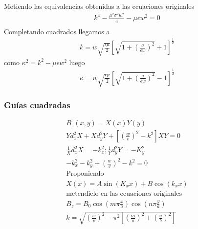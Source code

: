 Metiendo las equivalencias obtenidas a las ecuaciones originales 
\begin{subequations}
	\begin{eqnarray}
	k^4 - \frac{\mu^2 \sigma^2 w^2}{4} - \mu \epsilon w^2=0 \nonumber\\
	\end{eqnarray}
\end{subequations}
Completando cuadrados llegamos a 
\begin{subequations}
	\begin{eqnarray}
	k= w \sqrt{\frac{\epsilon \mu}{2}} \left[\sqrt{1+\left(\frac{\sigma}{\epsilon w} \right)^2}+1 \right]^\frac{1}{2}
	\end{eqnarray}
\end{subequations}
como $\kappa^2 = k^2 - \mu \epsilon w^2$ luego
\begin{subequations}
	\begin{eqnarray}
	\kappa = w \sqrt{\frac{\epsilon \mu}{2}} \left[\sqrt{1 + \left(\frac{\sigma}{\epsilon w} \right)^2}-1\right]^\frac{1}{2}
	\end{eqnarray}
\end{subequations}
\subsubsection{Guías cuadradas}
\begin{subequations}
	\begin{align}
	B_{z}(x,y)=X(x)Y(y) \nonumber \\
	Y d_{x}^2 X+X d_{y}^2Y + [(\frac{w}{v})^2-k^2]XY=0 \nonumber \\
	\frac{1}{X} d_{x}^2 X=-k_{x}^2 ; \frac{1}{Y}d_{y}^2 Y = -K_{y}^2 \nonumber \\
	-k_{x}^2 - k_{y}^2+(\frac{w}{v})^2 - k^2 = 0 \nonumber\\
	\text{Proponiendo } \nonumber \\
	X(x)=A \sin (K_{x} x) + B \cos(k_{x}x)  \\
	\text{metendielo en las ecuaciones originales} \nonumber \\
	B_{z}=B_{0} \cos(m \pi \frac{x}{a}) \cos(n \pi \frac{y}{a}) \\
	k = \sqrt{(\frac{w}{v})^2-\pi^2 [(\frac{m}{a})^2+(\frac{n}{b})^2]} 
	\end{align}
\end{subequations}

